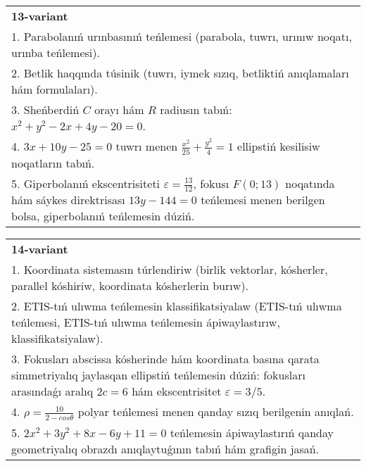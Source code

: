 \documentclass{article}
\begin{document}
\begin{tabular}{m{17cm}}
\textbf{13-variant}\\
1. Parabolanıń urınbasınıń teńlemesi (parabola, tuwrı, urınıw noqatı, urınba teńlemesi).\\

2. Betlik haqqında túsinik (tuwrı, iymek sızıq, betliktiń anıqlamaları hám formulaları).\\

3. Sheńberdiń $C$ orayı hám $R$ radiusın tabıń: $x^2+y^2-2 x+4 y-20=0$.\\

4. $3x + 10y - 25 = 0$ tuwrı menen $\frac{x^{2}}{25} + \frac{y^{2}}{4} = 1$ ellipstiń kesilisiw noqatların tabıń.\\

5. Giperbolanıń ekscentrisiteti $\varepsilon = \frac{13}{12}$, fokusı $F(0;13)$ noqatında hám sáykes direktrisası $13y - 144 = 0$ teńlemesi menen berilgen bolsa, giperbolanıń teńlemesin dúziń.  
\end{tabular}
\vspace{1cm}


\begin{tabular}{m{17cm}}
\textbf{14-variant}\\
1. Koordinata sistemasın túrlendiriw (birlik vektorlar, kósherler, parallel kóshiriw, koordinata kósherlerin burıw).\\

2. ETIS-tıń ulıwma teńlemesin klassifikatsiyalaw (ETIS-tıń ulıwma teńlemesi, ETIS-tıń ulıwma teńlemesin ápiwaylastırıw, klassifikatsiyalaw).\\

3. Fokusları abscissa kósherinde hám koordinata basına qarata simmetriyalıq jaylasqan ellipstiń teńlemesin dúziń: fokusları arasındaǵı aralıq $2 c=6$ hám ekscentrisitet $\varepsilon=3/5$.\\

4. $\rho = \frac{10}{2 - cos\theta}$ polyar teńlemesi menen qanday sızıq berilgenin anıqlań.  \\

5. $2x^{2} + 3y^{2} + 8x - 6y + 11 = 0$ teńlemesin ápiwaylastırıń qanday geometriyalıq obrazdı anıqlaytuǵının tabıń hám grafigin jasań.  
\end{tabular}
\vspace{1cm}
\end{document}
